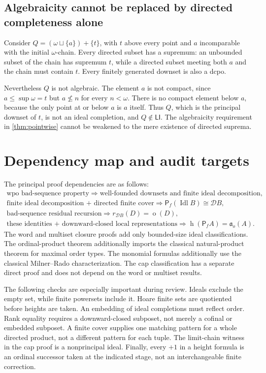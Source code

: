 \documentclass[11pt,letterpaper]{article}
\theoremstyle{teal}
\theoremstyle{definition}
\newcommand{\Pf}{\mathsf P_{\!f}}
\newcommand{\Down}{\mathcal D}
\newcommand{\Idl}{\operatorname{Idl}}
\newcommand{\hgt}{\operatorname{h}}
\newcommand{\mot}{\operatorname{o}}
\newcommand{\ao}{\mathfrak a_o}
\newcommand{\LI}{\mathsf{LI}}
\begin{document}
\subsection{Algebraicity cannot be replaced by directed completeness alone}
Consider $Q=(\omega\sqcup\{a\})+\{t\}$, with $t$ above every point and $a$ incomparable with the initial $\omega$-chain. Every directed subset has a supremum: an unbounded subset of the chain has supremum $t$, while a directed subset meeting both $a$ and the chain must contain $t$. Every finitely generated downset is also a dcpo.

Nevertheless $Q$ is not algebraic. The element $a$ is not compact, since $a\leq\sup\omega=t$ but $a\nleq n$ for every $n<\omega$. There is no compact element below $a$, because the only point at or below $a$ is $a$ itself. Thus $Q$, which is the principal downset of $t$, is not an ideal completion, and $Q\notin\LI$. The algebraicity requirement in \cref{thm:pointwise} cannot be weakened to the mere existence of directed suprema.

\section{Dependency map and audit targets}
The principal proof dependencies are as follows:
\[
 \begin{gathered}
 \text{wpo bad-sequence property}
 \Longrightarrow\text{well-founded downsets and finite ideal decomposition},\\
 \text{finite ideal decomposition + directed finite cover}
 \Longrightarrow\Pf(\Idl B)\cong\Down B,\\
 \text{bad-sequence residual recursion}
 \Longrightarrow r_{\Down B}(D)=\mot(D),\\
 \text{these identities + downward-closed local representations}
 \Longrightarrow\hgt(\Pf A)=\ao(A).
 \end{gathered}
\]
The word and multiset closure proofs add only bounded-size ideal classifications. The ordinal-product theorem additionally imports the classical natural-product theorem for maximal order types. The monomial formulas additionally use the classical Milner--Rado characterization. The cap classification has a separate direct proof and does not depend on the word or multiset results.

The following checks are especially important during review. Ideals exclude the empty set, while finite powersets include it. Hoare finite sets are quotiented before heights are taken. An embedding of ideal completions must reflect order. Rank equality requires a downward-closed subposet, not merely a cofinal or embedded subposet. A finite cover supplies one matching pattern for a whole directed product, not a different pattern for each tuple. The limit-chain witness in the cap proof is a nonprincipal ideal. Finally, every $+1$ in a height formula is an ordinal successor taken at the indicated stage, not an interchangeable finite correction.
\end{document}
